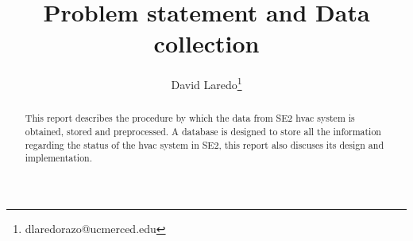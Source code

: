 \documentclass{article}
\title{Problem statement and Data collection}
\author[1]{David Laredo\thanks{dlaredorazo@ucmerced.edu}}
\date{}
\begin{document}
\maketitle %

\thispagestyle{fancy} %

\glsunsetall


\begin{abstract}

\noindent 

This report describes the procedure by which the data from SE2 \gls{hvac} system is obtained, stored and preprocessed. A database is designed to store all the information regarding the status of the \gls{hvac} system in SE2, this report also discuses its design and implementation.

\end{abstract}








{}
\printglossaries







\pagebreak
\appendix
\appendixpage


\end{document}
